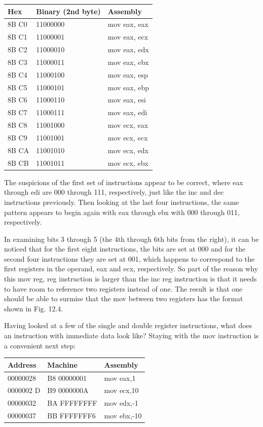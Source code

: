 \documentclass[10pt]{book}
\begin{document}
\begin{center}
\begin{tabular}{|l|l|l|}
\hline
Hex & Binary (2nd byte) & Assembly \\
\hline
8B C0 & 11000000 & mov eax, eax \\
\hline
8B C1 & 11000001 & mov eax, ecx \\
\hline
8B C2 & 11000010 & mov eax, edx \\
\hline
8B C3 & 11000011 & mov eax, ebx \\
\hline
8B C4 & 11000100 & mov eax, esp \\
\hline
8B C5 & 11000101 & mov eax, ebp \\
\hline
8B C6 & 11000110 & mov eax, esi \\
\hline
8B C7 & 11000111 & mov eax, edi \\
\hline
8B C8 & 11001000 & mov ecx, eax \\
\hline
8B C9 & 11001001 & mov ecx, ecx \\
\hline
8B CA & 11001010 & mov ecx, edx \\
\hline
8B CB & 11001011 & mov ecx, ebx \\
\hline
\end{tabular}
\end{center}

The suspicions of the first set of instructions appear to be correct, where eax through edi are 000 through 111, respectively, just like the inc and dec instructions previously. Then looking at the last four instructions, the same pattern appears to begin again with eax through ebx with 000 through 011, respectively.

In examining bits 3 through 5 (the 4th through 6th bits from the right), it can be noticed that for the first eight instructions, the bits are set at 000 and for the second four instructions they are set at 001, which happens to correspond to the first registers in the operand, eax and ecx, respectively. So part of the reason why this mov reg, reg instruction is larger than the inc reg instruction is that it needs to have room to reference two registers instead of one. The result is that one should be able to surmise that the mov between two registers has the format shown in Fig. 12.4.

Having looked at a few of the single and double register instructions, what does an instruction with immediate data look like? Staying with the mov instruction is a convenient next step:

\begin{center}
\begin{tabular}{|l|l|l|}
\hline
Address & Machine & Assembly \\
\hline
00000028 & B8 00000001 & mov eax,1 \\
\hline
0000002 D & B9 0000000A & mov ecx,10 \\
\hline
00000032 & BA FFFFFFFF & mov edx,-1 \\
\hline
00000037 & BB FFFFFFF6 & mov ebx,-10 \\
\hline
\end{tabular}
\end{center}
\end{document}
